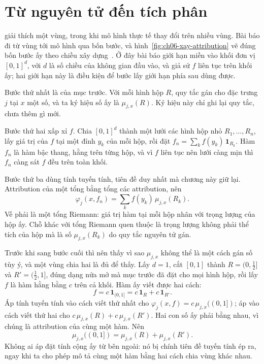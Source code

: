 \section{Từ nguyên tử đến tích phân}
\label{sec:ch06-tu-nguyen-tu-den-tich-phan}

%
%
 giải thích một vùng, trong khi mô hình thực
tế thay đổi trên nhiều vùng. Bài báo đi từ vùng tới mô hình qua bốn bước, và
hình~\ref{fig:ch06-xay-attribution} vẽ đúng bốn bước ấy theo chiều xây
dựng~\autocite{p17firstprinciples}. Ở đây bài báo giới hạn miền vào khối đơn vị
$[0,1]^d$, với $d$ là số chiều của không gian đầu vào, và giả sử $f$ liên tục
trên khối ấy; hai giới hạn này là điều kiện để bước lấy giới hạn phía sau dùng
được.

Bước thứ nhất là  của mục
trước. Với mỗi hình hộp $R$, quy tắc gán cho đặc trưng $j$ tại $x$ một số, và
ta ký hiệu số ấy là $\mu_{j,x}(R)$. Ký hiệu này chỉ ghi lại quy tắc, chưa thêm
gì mới.

Bước thứ hai xấp xỉ $f$. Chia $[0,1]^d$ thành một lưới các hình hộp nhỏ
$R_1,\dots,R_n$, lấy giá trị của $f$ tại một đỉnh $y_k$ của mỗi hộp, rồi đặt
$f_n=\sum_k f(y_k)\,\mathbf{1}_{R_k}$. Hàm $f_n$ là hàm bậc thang, hằng trên
từng hộp, và vì $f$ liên tục nên lưới càng mịn thì $f_n$ càng sát $f$ đều trên
toàn khối.

Bước thứ ba dùng tính tuyến tính, tiên đề duy nhất mà chương này giữ lại.
Attribution của một tổng bằng tổng các attribution, nên
\begin{equation}
\label{eq:ch06-tong-riemann}
\varphi_j(x,f_n)=\sum_{k} f(y_k)\,\mu_{j,x}(R_k).
\end{equation}
Vế phải là một tổng Riemann: giá trị hàm tại mỗi hộp nhân với trọng lượng của
hộp ấy. Chỗ khác với tổng Riemann quen thuộc là trọng lượng không phải thể tích
của hộp mà là số $\mu_{j,x}(R_k)$ do quy tắc nguyên tử gán.

Trước khi sang bước cuối thì nên thấy vì sao $\mu_{j,x}$ không thể là một cách
gán số tùy ý, và một vùng chia hai là đủ để thấy. Lấy $d = 1$, cắt $[0,1]$
thành $R = (0,\tfrac{1}{2}]$ và $R' = (\tfrac{1}{2},1]$, đúng dạng nửa mở mà mục
trước đã đặt cho mọi hình hộp, rồi lấy $f$ là hàm hằng
bằng $c$ trên cả khối. Hàm ấy viết được hai cách:
\[
  f = c\,\mathbf{1}_{(0,1]}
    = c\,\mathbf{1}_{R} + c\,\mathbf{1}_{R'} .
\]
Áp tính tuyến tính vào cách viết thứ nhất cho
$\varphi_j(x,f) = c\,\mu_{j,x}((0,1])$; áp vào cách viết thứ hai cho
$c\,\mu_{j,x}(R) + c\,\mu_{j,x}(R')$. Hai con số ấy phải bằng nhau, vì chúng là
attribution của cùng một hàm. Nên
\[
  \mu_{j,x}((0,1]) = \mu_{j,x}(R) + \mu_{j,x}(R') .
\]
Không ai áp đặt tính cộng ấy từ bên ngoài: nó bị chính tiên đề tuyến tính ép ra,
ngay khi ta cho phép mô tả cùng một hàm bằng hai cách chia vùng khác nhau.


